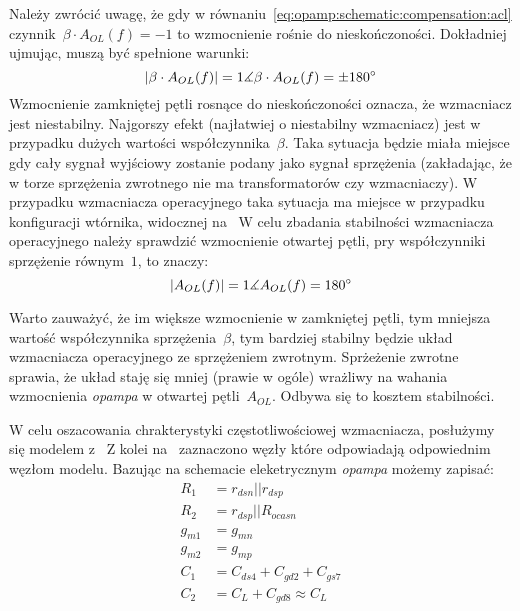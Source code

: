 \documentclass[twoside,pl,final]{labman}
\begin{document}
Należy zwrócić uwagę, że gdy w równaniu~\ref{eq:opamp:schematic:compensation:acl}
czynnik~$\beta \cdot A_{OL}(f) = -1$ to wzmocnienie rośnie do nieskończoności.
Dokładniej ujmując, muszą być spełnione warunki:
\begin{equation}
  | \beta \cdot A_{OL}(f) | = 1
  \label{eq:opamp:schematic:compensation:gen:amp} \\
  \measuredangle \beta \cdot A_{OL}(f) = \pm 180^\circ
  \label{eq:opamp:schematic:compensation:gen:phase}
\end{equation}
Wzmocnienie zamkniętej pętli rosnące do nieskończoności oznacza,
że wzmacniacz jest niestabilny.
Najgorszy efekt (najłatwiej o niestabilny wzmacniacz) jest w przypadku dużych wartości współczynnika~$\beta$.
Taka sytuacja będzie miała miejsce gdy cały sygnał wyjściowy zostanie podany jako sygnał sprzężenia
(zakładając, że w torze sprzężenia zwrotnego nie ma transformatorów czy wzmacniaczy).
W przypadku wzmacniacza operacyjnego taka sytuacja ma miejsce w przypadku konfiguracji wtórnika,
widocznej na~
W celu zbadania stabilności wzmacniacza operacyjnego należy sprawdzić wzmocnienie otwartej pętli,
pry współczynniki sprzężenie równym~$1$, to znaczy:
\begin{equation}
  | A_{OL}(f) | = 1
  \label{eq:opamp:schematic:compensation:condition:amp} \\
  \measuredangle A_{OL}(f) = 180^\circ
  \label{eq:opamp:schematic:compensation:condition:phase}
\end{equation}

Warto zauważyć, że im większe wzmocnienie w zamkniętej pętli,
tym mniejsza wartość współczynnika sprzężenia~$\beta$,
tym bardziej stabilny będzie układ wzmacniacza operacyjnego ze sprzężeniem zwrotnym.
Sprżeżenie zwrotne sprawia, że układ staję się mniej (prawie w ogóle) wrażliwy na wahania
wzmocnienia \emph{opampa} w otwartej pętli~$A_{OL}$.
Odbywa się to kosztem stabilności.

W celu oszacowania chrakterystyki częstotliwościowej wzmacniacza,
posłużymy się modelem z~
Z kolei na~ zaznaczono węzły które odpowiadają odpowiednim węzłom modelu.
Bazując na schemacie eleketrycznym \emph{opampa} możemy zapisać:
\begin{align}
  R_1 &= r_{dsn} || r_{dsp} \nonumber \\
  R_2 &= r_{dsp} || R_{ocasn} \nonumber \\
  g_{m1} &= g_{mn} \nonumber \\
  g_{m2} &= g_{mp} \nonumber \\
  C_1 &= C_{ds4} + C_{gd2} + C_{gs7} \nonumber \\
  C_2 &= C_L + C_{gd8} \approx C_L \nonumber
\end{align}
\end{document}
